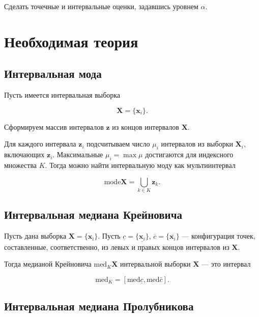 \documentclass{article}
\begin{document}
  Сделать точечные и интервальные оценки, задавшись уровнем \( \alpha \).

  \section{Необходимая теория}

  \subsection{Интервальная мода}

  Пусть имеется интервальная выборка

  \[
    \mathbf{X} = \{ \mathbf{x}_i \}.
  \]

  Сформируем массив интервалов \( \mathbf{z} \) из концов интервалов
  \( \mathbf{X} \).

  Для каждого интервала \( \mathbf{z}_i \) подсчитываем число \( \mu_i \)
  интервалов из выборки \( \mathbf{X}_i \), включающих \( \mathbf{z}_i \).
  Максимальные \( \mu_i = \max \mu \) достигаются для индексного множества
  \( K \). Тогда можно найти интервальную моду как мультиинтервал

  \begin{equation}
    \text{mode} \mathbf{X} = \bigcup_{k \in K} \mathbf{z}_k.
  \end{equation}

  \subsection{Интервальная медиана Крейновича}

  Пусть дана выборка \( \mathbf{X} = \{ \mathbf{x}_i \} \). Пусть
  \( \underline c = \{ \underline{\mathbf{x}_i} \} \),
  \( \overline c = \{ \overline{\mathbf{x}_i} \} \) --- конфигурация
  точек, составленные, соответственно, из левых и правых концов интервалов
  из \( \mathbf{X} \).

  Тогда медианой Крейновича \( \text{med}_K \mathbf{X} \) интервальной
  выборки \( \mathbf{X} \) --- это интервал

  \begin{equation}
    \text{med}_K = [\text{med} \underline c, \text{med} \overline c].
  \end{equation}

  \subsection{Интервальная медиана Пролубникова}
\end{document}

